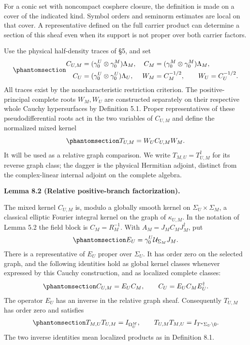 \documentclass[
  english,
  11pt,
  reqno]{amsart}
\makeatletter
\newcommand{\pandocstatementheading}[1]{%
  \par\if@nobreak\else
    \addpenalty{\@beginparpenalty}%
    \addvspace{.5\baselineskip plus .2\baselineskip minus .2\baselineskip}%
  \fi
  {\normalfont\bfseries #1\par}%
  \nobreak\@afterindenttrue\@afterheading
}
\makeatother
\begin{document}
For a conic set with noncompact cosphere closure, the definition is made
on a cover of the indicated kind. Symbol orders and seminorm estimates
are local on that cover. A representative defined on the full carrier
product can determine a section of this sheaf even when its support is
not proper over both carrier factors.

Use the physical half-density traces of §5, and set
\begin{equation}\protect\phantomsection\label{eq:relative-mixed-traces}{
\begin{aligned}
C_{U,M}&=(\gamma_0^U\otimes\gamma_0^M)\Lambda_M,&
C_M&=(\gamma_0^M\otimes\gamma_0^M)\Lambda_M,\\
C_U&=(\gamma_0^U\otimes\gamma_0^U)\Lambda_U,&
W_M&=C_M^{-1/2},\qquad W_U=C_U^{-1/2}.
\end{aligned}
}\end{equation} All traces exist by the noncharacteristic restriction
criterion. The positive-principal complete roots \(W_M,W_U\) are
constructed separately on their respective whole Cauchy hypersurfaces by
Definition 5.1. Proper representatives of these pseudodifferential roots
act in the two variables of \(C_{U,M}\) and define the normalized mixed
kernel
\begin{equation}\protect\phantomsection\label{eq:relative-normalized-carrier}{
T_{U,M}=W_U C_{U,M}W_M.
}\end{equation} It will be used as a relative graph comparison. We write
\(T_{M,U}=T_{U,M}^{\dagger}\) for its reverse graph class; the dagger is
the physical Hermitian adjoint, distinct from the complex-linear
internal adjoint on the complete algebra.

\pandocstatementheading{\protect{}\label{lem:relative-positive-factorization}Lemma 8.2 (Relative positive-branch factorization).}

The mixed kernel \(C_{U,M}\) is, modulo a globally smooth kernel on
\(\Sigma_U\times\Sigma_M\), a classical elliptic Fourier integral kernel
on the graph of \(\kappa_{U,M}\). In the notation of Lemma 5.2 the field
block is \(C_M=R_M^{-1}\). With \(A_M=J_MC_MJ_M^{\dagger}\), put
\begin{equation}\protect\phantomsection\label{eq:relative-positive-field-transfer}{
E_U=\gamma_0^U\mathcal U_{\Sigma_M}J_M.
}\end{equation} There is a representative of \(E_U\) proper over
\(\Sigma_U\). It has order zero on the selected graph, and the following
identities hold as global kernel classes whenever expressed by this
Cauchy construction, and as localized complete classes:
\begin{equation}\protect\phantomsection\label{eq:relative-positive-factorization}{
C_{U,M}=E_U C_M,
\qquad
C_U=E_U C_M E_U^{\dagger}.
}\end{equation} The operator \(E_U\) has an inverse in the relative
graph sheaf. Consequently \(T_{U,M}\) has order zero and satisfies
\begin{equation}\protect\phantomsection\label{eq:relative-carrier-inverse}{
T_{M,U}T_{U,M}=I_{\Omega_U^M},
\qquad
T_{U,M}T_{M,U}=I_{T^*\Sigma_U\setminus0}.
}\end{equation} The two inverse identities mean localized products as in
Definition 8.1.
\end{document}
